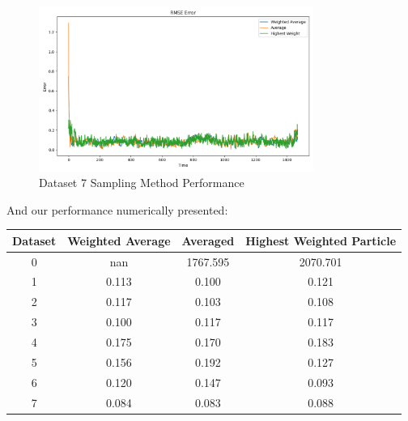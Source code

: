 \documentclass{article}
\begin{document}
\begin{figure}[H]
    \centering
    \includegraphics[width=0.8\textwidth]{./imgs/task2/studentdata7_rmse_methods.png}
    \caption{Dataset 7 Sampling Method Performance}
\end{figure}

And our performance numerically presented:

\begin{table}[H]
    \centering
    \begin{tabular}{|c|c|c|c|}
        \hline
        \textbf{Dataset} & \textbf{Weighted Average} & \textbf{Averaged} & \textbf{Highest Weighted Particle} \\ \hline
        0                & nan                       & 1767.595          & 2070.701                           \\ \hline
        1                & 0.113                     & 0.100             & 0.121                              \\ \hline
        2                & 0.117                     & 0.103             & 0.108                              \\ \hline
        3                & 0.100                     & 0.117             & 0.117                              \\ \hline
        4                & 0.175                     & 0.170             & 0.183                              \\ \hline
        5                & 0.156                     & 0.192             & 0.127                              \\ \hline
        6                & 0.120                     & 0.147             & 0.093                              \\ \hline
        7                & 0.084                     & 0.083             & 0.088                              \\ \hline
    \end{tabular}
\end{table}
\end{document}
